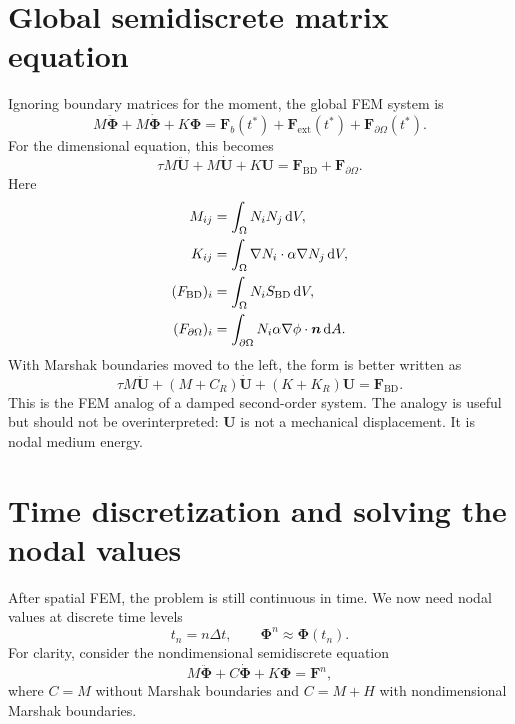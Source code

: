 \documentclass[11pt]{article}
\begin{document}
\section{Global semidiscrete matrix equation}
Ignoring boundary matrices for the moment, the global FEM system is
\begin{equation}
    \boxed{
    M\ddot{\bm{\Phi}}+M\dot{\bm{\Phi}}+K\bm{\Phi}=\bm{F}_b(t^*)+\bm{F}_{\mathrm{ext}}(t^*)+\bm{F}_{\partial\Omega}(t^*).}
    \label{eq:fem_global_1d_matrix}
\end{equation}
For the dimensional equation, this becomes
\begin{equation}
    \boxed{
    \tau M\ddot{\bm{U}}+M\dot{\bm{U}}+K\bm{U}=\bm{F}_{\mathrm{BD}}+\bm{F}_{\partial\Omega}.}
    \label{eq:fem_dimensional_matrix_full}
\end{equation}
Here
\begin{align}
    M_{ij} &=\int_\Omega N_iN_j\,\dd V,\\
    K_{ij} &=\int_\Omega \nabla N_i\cdot\alpha\nabla N_j\,\dd V,\\
    (F_{\mathrm{BD}})_i &=\int_\Omega N_iS_{\mathrm{BD}}\,\dd V,\\
    (F_{\partial\Omega})_i &=\int_{\partial\Omega}N_i\alpha\nabla\phi\cdot\bm{n}\,\dd A.
\end{align}
With Marshak boundaries moved to the left, the form is better written as
\begin{equation}
    \boxed{
    \tau M\ddot{\bm{U}}+(M+C_R)\dot{\bm{U}}+(K+K_R)\bm{U}=\bm{F}_{\mathrm{BD}}.}
    \label{eq:fem_dimensional_matrix_robin}
\end{equation}
This is the FEM analog of a damped second-order system. The analogy is useful but should not be overinterpreted: \(\bm{U}\) is not a mechanical displacement. It is nodal medium energy.

\section{Time discretization and solving the nodal values}
After spatial FEM, the problem is still continuous in time. We now need nodal values at discrete time levels
\begin{equation}
    t_n=n\Delta t,
    \qquad
    \bm{\Phi}^n\approx \bm{\Phi}(t_n).
\end{equation}
For clarity, consider the nondimensional semidiscrete equation
\begin{equation}
    M\ddot{\bm{\Phi}}+C\dot{\bm{\Phi}}+K\bm{\Phi}=\bm{F}^{n},
    \label{eq:fem_second_order_generic}
\end{equation}
where \(C=M\) without Marshak boundaries and \(C=M+H\) with nondimensional Marshak boundaries.
\end{document}
